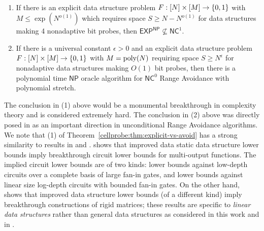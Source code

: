 % 
\begin{theorem}\label{cellprobe:thm:explicit-vs-avoid}
~
\begin{enumerate}
    \item If there is an explicit data structure problem $F:[N] \times [M] \to \{0,1\}$ with $M \leq \exp(N^{o(1)})$ which requires space $S \geq N - N^{o(1)}$ for data structures making 4 nonadaptive bit probes, then $\mathsf{EXP^{NP}} \not\subseteq \mathsf{NC}^1$.
    \item If there is a universal constant $\epsilon>0$ and an explicit data structure problem $F:[N] \times [M] \to \{0,1\}$ with $M = \mathrm{poly}(N)$ requiring space $S \geq N^{\epsilon}$ for nonadaptive data structures making $O(1)$ bit probes, then there is a polynomial time $\mathsf{NP}$ oracle algorithm for $\mathsf{NC}^0$ Range Avoidance with polynomial stretch.
\end{enumerate}
\end{theorem}

The conclusion in (1) above would be a monumental breakthrough in complexity theory and is considered extremely hard. The conclusion in (2) above was directly posed in \cite{RSW} as an important direction in unconditional Range Avoidance algorithms.
We note that (1) of Theorem~\ref{cellprobe:thm:explicit-vs-avoid} has a strong similarity to results in \cite{viola-maximal} and \cite{omri}. \cite{viola-maximal} shows that improved data static data structure lower bounds imply breakthrough circuit lower bounds for multi-output functions. The implied circuit lower bounds are of two kinds: lower bounds against low-depth circuits over a complete basis of large fan-in gates, and lower bounds against linear size log-depth circuits with bounded fan-in gates. 
On the other hand, \cite{omri} shows that improved data structure lower bounds (of a different kind) imply breakthrough constructions of rigid matrices; these results are specific to \emph{linear data structures} rather than general data structures as considered in this work and in \cite{viola-maximal}. 

